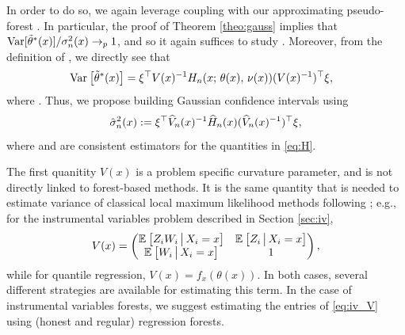 \documentclass[aos]{imsart}
\theoremstyle{plain}
\theoremstyle{definition}
\theoremstyle{remark}
\begin{document}
\begin{CJK}{UTF8}{gbsn}
{In order to do so, we again leverage coupling with our approximating pseudo-forest .
In particular, the proof of Theorem \ref{theo:gauss} implies that 
$\text{Var}[\tilde{\theta}^*(x)]/\sigma^2_n(x) \rightarrow_p 1$, and so it again suffices to study
 . Moreover, from the definition of , we directly see that
\begin{equation}
\label{eq:H}
\begin{split}
&\Var{\ttheta^*(x)} = \xi^\top V(x)^{-1} H_n(x; \, \theta(x), \, \nu(x)) (V(x)^{-1})^\top \xi,
\end{split}
\end{equation}
where .
Thus, we propose building Gaussian confidence intervals using
\begin{equation}
\label{eq:sigma_hat}
\hsigma_n^2(x) := \xi^\top \hV_n(x)^{-1} \hH_n(x) (\hV_n(x)^{-1})^\top \xi,
\end{equation}
where  and  are consistent estimators
for the quantities in \eqref{eq:H}.

The first quanitity $V(x)$ is a problem specific curvature parameter, and is
not directly linked to forest-based methods. It is the same quantity that is needed
to estimate variance of classical local maximum likelihood methods following \citet{newey1994kernel};
e.g., for the instrumental variables problem described in Section \ref{sec:iv},
\begin{equation}
\label{eq:iv_V}
V(x) = \begin{pmatrix}
\EE{Z_iW_i\cond X_i = x} & \EE{Z_i\cond X_i = x} \\
\EE{W_i\cond X_i = x} & 1
\end{pmatrix},
\end{equation}
while for quantile regression, $V(x) = f_x(\theta(x))$.  In both cases,
several different strategies are available for estimating this term. In the
case of instrumental variables forests, we suggest estimating the
entries of \eqref{eq:iv_V} using (honest and regular) regression forests.

}
\end{CJK}
\end{document}
